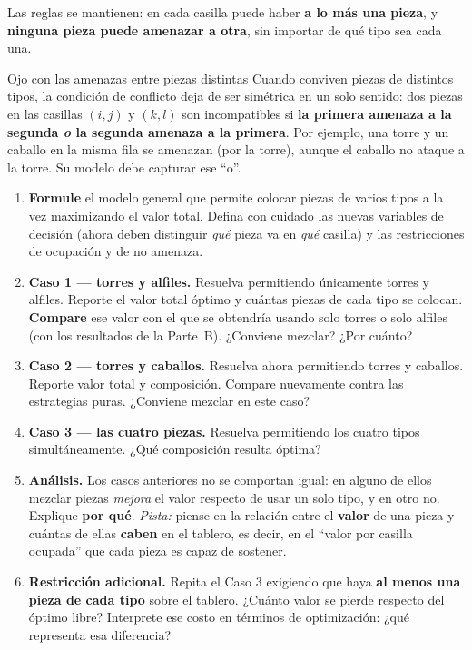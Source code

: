 \documentclass[12pt,a4paper]{article}
\begin{document}
Las reglas se mantienen: en cada casilla puede haber \textbf{a lo más una pieza}, y
\textbf{ninguna pieza puede amenazar a otra}, sin importar de qué tipo sea cada una.

\begin{ayuda}{Ojo con las amenazas entre piezas distintas}
\vspace{2pt}
Cuando conviven piezas de distintos tipos, la condición de conflicto deja de ser
simétrica en un solo sentido: dos piezas en las casillas $(i,j)$ y $(k,l)$ son
incompatibles si \textbf{la primera amenaza a la segunda \emph{o} la segunda amenaza
a la primera}. Por ejemplo, una torre y un caballo en la misma fila se amenazan
(por la torre), aunque el caballo no ataque a la torre. Su modelo debe capturar
ese ``o''.
\end{ayuda}

\begin{enumerate}[label=\alph*), leftmargin=*, topsep=2pt]
    \item \textbf{Formule} el modelo general que permite colocar piezas de varios
          tipos a la vez maximizando el valor total. Defina con cuidado las nuevas
          variables de decisión (ahora deben distinguir \emph{qué} pieza va en
          \emph{qué} casilla) y las restricciones de ocupación y de no amenaza.
    \item \textbf{Caso 1 --- torres y alfiles.} Resuelva permitiendo únicamente
          torres y alfiles. Reporte el valor total óptimo y cuántas piezas de cada
          tipo se colocan. \textbf{Compare} ese valor con el que se obtendría
          usando solo torres o solo alfiles (con los resultados de la Parte~B).
          ¿Conviene mezclar? ¿Por cuánto?
    \item \textbf{Caso 2 --- torres y caballos.} Resuelva ahora permitiendo torres
          y caballos. Reporte valor total y composición. Compare nuevamente contra
          las estrategias puras. ¿Conviene mezclar en este caso?
    \item \textbf{Caso 3 --- las cuatro piezas.} Resuelva permitiendo los cuatro
          tipos simultáneamente. ¿Qué composición resulta óptima?
    \item \textbf{Análisis.} Los casos anteriores no se comportan igual: en alguno
          de ellos mezclar piezas \emph{mejora} el valor respecto de usar un solo
          tipo, y en otro no. Explique \textbf{por qué}. \emph{Pista:} piense en la
          relación entre el \textbf{valor} de una pieza y cuántas de ellas
          \textbf{caben} en el tablero, es decir, en el ``valor por casilla
          ocupada'' que cada pieza es capaz de sostener.
    \item \textbf{Restricción adicional.} Repita el Caso 3 exigiendo que haya
          \textbf{al menos una pieza de cada tipo} sobre el tablero. ¿Cuánto valor
          se pierde respecto del óptimo libre? Interprete ese costo en términos de
          optimización: ¿qué representa esa diferencia?
\end{enumerate}
\end{document}
